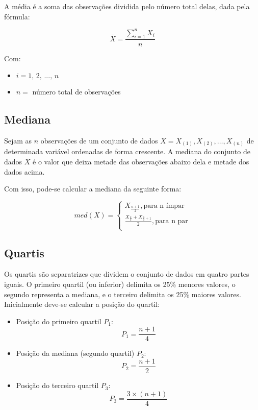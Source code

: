 \documentclass[
  portuguese,
]{estat/estat}
\begin{document}
A média é a soma das observações dividida pelo número total delas, dada
pela fórmula:

\[\bar{X}=\frac{\sum\limits_{i=1}^{n}X_i}{n}\]

Com:

\begin{itemize}
\item
  \(i = 1, \, 2, \, ..., \, n\)
\item
  \(n =\) número total de observações
\end{itemize}

\subsection{Mediana}\label{mediana}

Sejam as \(n\) observações de um conjunto de dados
\(X=X_{(1)},X_{(2)},\ldots, X_{(n)}\) de determinada variável ordenadas
de forma crescente. A mediana do conjunto de dados \(X\) é o valor que
deixa metade das observações abaixo dela e metade dos dados acima.

Com isso, pode-se calcular a mediana da seguinte forma:

\[
med(X) =
    \begin{cases}
         X_{\frac{n+1}{2}}, \textrm{para n ímpar} \\
         \frac{X_{\frac{n}{2}}+X_{\frac{n}{2} + 1}}{2}, \textrm{para n par} \\
    \end{cases}
\]

\subsection{Quartis}\label{quartis}

Os quartis são separatrizes que dividem o conjunto de dados em quatro
partes iguais. O primeiro quartil (ou inferior) delimita os 25\% menores
valores, o segundo representa a mediana, e o terceiro delimita os 25\%
maiores valores. Inicialmente deve-se calcular a posição do quartil:

\begin{itemize}
\item
  Posição do primeiro quartil \(P_1\): \[P_1=\frac{n+1}{4}\]
\item
  Posição da mediana (segundo quartil) \(P_2\): \[P_2 = \frac{n+1}{2}\]
\item
  Posição do terceiro quartil \(P_3\): \[P_3=\frac{3 \times (n+1)}{4}\]
\end{itemize}
\end{document}
